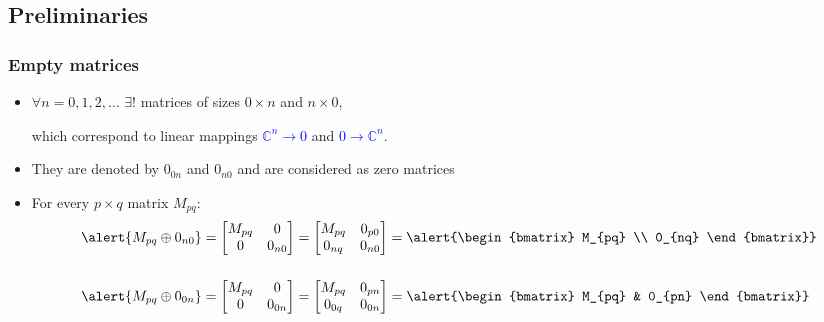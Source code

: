 \documentclass{beamer}
\begin{document}
\subsection{Preliminaries}
\begin{frame}[t]
\frametitle{Empty matrices}

\begin{itemize}
  \item $\forall n=0,1,2,\dots$
      $\exists !$ matrices of sizes
      \alert{$0\times n$} and
      \alert{$n\times 0$},

      which correspond to linear
  mappings
  \textcolor{blue}{$\mathbb C^n\to
  0$} and
  \textcolor{blue}{$0\to\mathbb
      C^n$}.
\medskip

  \item They are denoted by
      \alert{$0_{0n}$} and
      \alert{$0_{n0}$} and are
      considered as zero matrices
\medskip

  \item For every $p\times q$
      matrix $M_{pq}$:
\begin{align*}
\alert{M_{pq}\oplus 0_{n0}}&=\begin{bmatrix}
  M_{pq} & 0 \\
  0 &0_{n0}
\end{bmatrix}=\begin{bmatrix}
  M_{pq}& 0_{p0} \\
  0_{nq}& 0_{n0}
\end{bmatrix}=\alert{\begin{bmatrix}
M_{pq} \\ 0_{nq}
\end{bmatrix}}
\\[5mm]
\alert{M_{pq}\oplus 0_{0n}}&=\begin{bmatrix}
  M_{pq} & 0 \\
  0 & 0_{0n}
\end{bmatrix}=\begin{bmatrix}
  M_{pq}& 0_{pn} \\
  0_{0q}& 0_{0n}
\end{bmatrix}=\alert{\begin{bmatrix}
   M_{pq} & 0_{pn}
\end{bmatrix}}
\end{align*}

\end{itemize}
  \end{frame}
\end{document}
